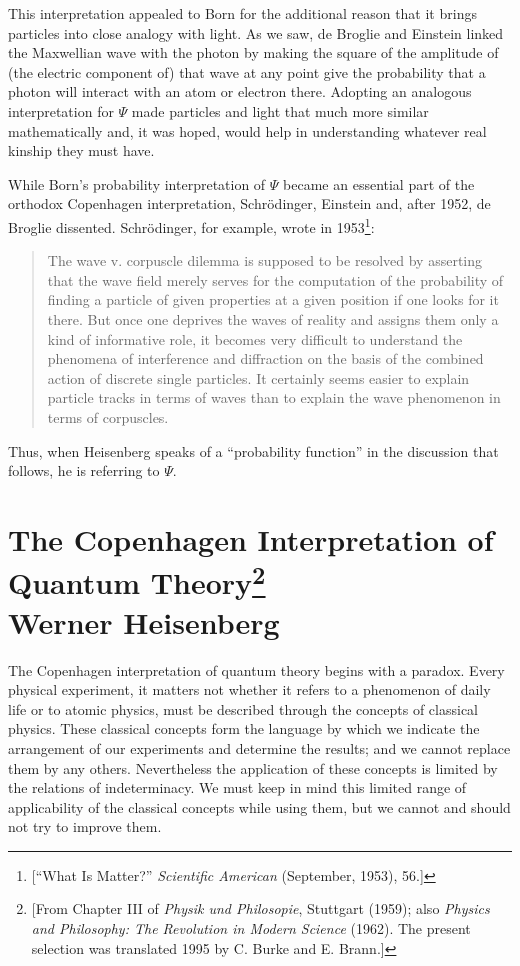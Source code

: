 This interpretation appealed to Born for the additional reason that it
brings particles into close analogy with light. As we saw, de Broglie
and Einstein linked the Maxwellian wave with the photon by making the
square of the amplitude of (the electric component of) that wave at any
point give the probability that a photon will interact with an atom or
electron there. Adopting an analogous interpretation for $\Psi$ made
particles and light that much more similar mathematically and, it was
hoped, would help in understanding whatever real kinship they must have.

While Born's probability interpretation of $\Psi$ became an essential
part of the orthodox Copenhagen interpretation, Schrödinger, Einstein
and, after 1952, de Broglie dissented. Schrödinger, for example, wrote
in 1953\footnote{{[}``What Is Matter?'' \emph{Scientific American}
  (September, 1953), 56.{]}}:

\begin{quote}
The wave v. corpuscle dilemma is supposed to be resolved by asserting
that the wave field merely serves for the computation of the probability
of finding a particle of given properties at a given position if one
looks for it there. But once one deprives the waves of reality and
assigns them only a kind of informative role, it becomes very difficult
to understand the phenomena of interference and diffraction on the basis
of the combined action of discrete single particles. It certainly seems
easier to explain particle tracks in terms of waves than to explain the
wave phenomenon in terms of corpuscles.
\end{quote}

Thus, when Heisenberg speaks of a ``probability function'' in the
discussion that follows, he is referring to $\Psi$.


\section*{The Copenhagen Interpretation of Quantum Theory\footnote{[From Chapter
  III of \emph{Physik und Philosopie}, Stuttgart (1959); also
  \emph{Physics and Philosophy: The Revolution in Modern Science}
  (1962). The present selection was translated 1995 by C. Burke and E.
  Brann.]}\\
  {\large Werner Heisenberg}}


The Copenhagen interpretation of quantum theory begins with a paradox.
Every physical experiment, it matters not whether it refers to a
phenomenon of daily life or to atomic physics, must be described through
the concepts of classical physics. These classical concepts form the
language by which we indicate the arrangement of our experiments and
determine the results; and we cannot replace them by any others.
Nevertheless the application of these concepts is limited by the
relations of indeterminacy. We must keep in mind this limited range of
applicability of the classical concepts while using them, but we cannot
and should not try to improve them.

